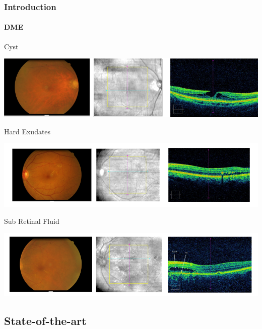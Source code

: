 \documentclass{beamer}
\begin{document}
\begin{frame}
  \frametitle{Introduction}
  \framesubtitle{DME}
    \begin{block}{\footnotesize Cyst}
    \begin{center}
      \includegraphics[scale=0.2]{images/Cyst_DME.png}
    \end{center}
  \end{block}
  \begin{block}{\footnotesize Hard Exudates}
    \begin{center}
      \includegraphics[scale=0.2]{images/HE_DME.png}
    \end{center}
  \end{block}
  \begin{block}{\footnotesize Sub Retinal Fluid}
    \begin{center}
      \includegraphics[scale=0.2]{images/SF_DME.png}
    \end{center}
  \end{block}
\end{frame}


\subsection{State-of-the-art}
\end{document}
